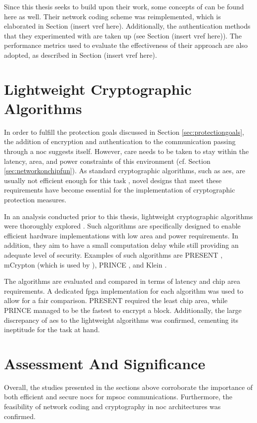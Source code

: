 Since this thesis seeks to build upon their work, some concepts of \citeauthor{moriam18activeattackers} can be found here as well. Their network coding
scheme was reimplemented, which is elaborated in Section (insert vref here). Additionally, the authentication methods that they experimented with
are taken up (see Section (insert vref here)). The performance metrics used to evaluate the effectiveness of their approach are also adopted, as
described in Section (insert vref here).

\section{Lightweight Cryptographic Algorithms}\label{sec:lightweightcrypto}
In order to fulfill the protection goals discussed in Section \ref{sec:protectiongoals}, the addition of encryption and authentication to
the communication passing through a \gls{noc} suggests itself. However, care needs to be taken to stay within the latency, area, and power constraints
of this environment (cf. Section \ref{sec:networkonchipfun}). As standard cryptographic algorithms, such as \gls{aes}, are usually not efficient
enough for this task \cite[1]{bogdanov07present}, novel designs that meet these requirements have become essential for the implementation of
cryptographic protection measures.

In an analysis conducted prior to this thesis, lightweight cryptographic algorithms were thoroughly explored \cite{harttung17lightweightcrypto}. Such
algorithms are
specifically designed to enable efficient hardware implementations with low area and power requirements. In addition, they aim to have a small
computation delay while still providing an adequate level of security. Examples of such algorithms are PRESENT \cite{bogdanov07present},
mCrypton \cite{lim06mcrypton} (which is used by \citeauthor{moriam18activeattackers} \cite[3]{moriam18activeattackers}), PRINCE \cite{borghoff12prince},
and Klein \cite{gong12klein}.

The algorithms are evaluated and compared in terms of latency and chip area requirements. A dedicated \gls{fpga} implementation for each algorithm
was used to allow for a fair comparison. PRESENT required the least chip area, while PRINCE managed to be the fastest to encrypt a block.
Additionally, the large discrepancy of \gls{aes} to the lightweight algorithms was confirmed, cementing its ineptitude for the task at hand.

\section{Assessment And Significance}
Overall, the studies presented in the sections above corroborate the importance of both efficient and secure \glspl{noc} for \gls{mpsoc}
communications. Furthermore, the feasibility of network coding and cryptography in \gls{noc} architectures was confirmed.

